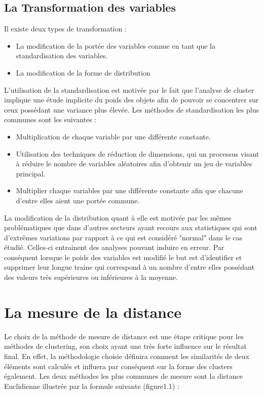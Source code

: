 \documentclass[memoire.tex]{subfiles}
\begin{document}
\subsection{La Transformation des variables}
Il existe deux types de transformation : \begin{itemize}
\item La modification de la portée des variables connue en tant que la standardisation des variables.
\item{La modification de la forme de distribution}
\end{itemize}
L'utilisation de la standardisation est motivée par le fait que l'analyse de cluster implique une étude implicite du poids des objets afin de pouvoir se concentrer sur ceux possédant une variance plus élevée. Les méthodes de standardisation les plus communes sont les suivantes \cite{ref9} : \begin{itemize}
\item Multiplication de chaque variable par une différente constante.
\item Utilisation des techniques de réduction de dimensions, qui un processus visant à réduire le nombre de variables aléatoires afin d'obtenir un jeu de variables principal.
\item Multiplier chaque variables par une différente constante afin que chacune d'entre elles aient une portée commune.
\end{itemize}
La modification de la distribution quant à elle est motivée par les mêmes problématiques que dans d'autres secteurs ayant recours aux statistiques qui sont d'extrêmes variations par rapport à ce qui est considéré "normal" dans le cas étudié. Celles-ci entrainent des analyses pouvant induire en erreur. Par conséquent lorsque le poids des variables est modifié le but est d'identifier et supprimer leur longue traine qui correspond à un nombre d'entre elles possédant des valeurs très supérieures ou inférieures à la moyenne.

\section{La mesure de la distance}
Le choix de la méthode de mesure de distance est une étape critique pour les méthodes de clustering, son choix ayant une très forte influence sur le résultat final. En effet, la méthodologie choisie définira comment les similarités de deux éléments sont calculés et influera par conséquent sur la forme des clusters également. Les deux méthodes les plus communes de mesure sont la distance Euclidienne illustrée par la formule suivante (figure1.1) : 
\end{document}
